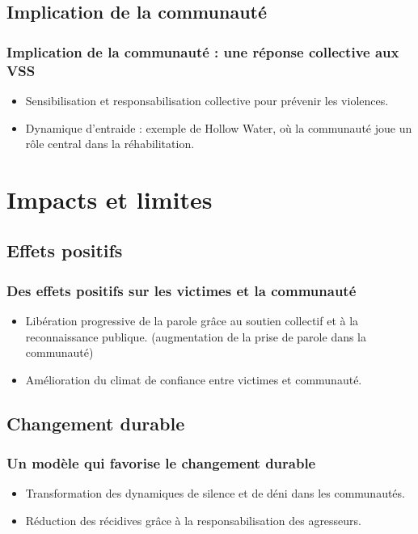 \documentclass[french]{beamer}
\begin{document}
\subsection{Implication de la communauté}
\begin{frame}
  \frametitle{Implication de la communauté : une réponse collective aux VSS}
  \begin{itemize}
    \item Sensibilisation et responsabilisation collective pour prévenir les violences.
    \item Dynamique d’entraide : exemple de Hollow Water, où la communauté joue un rôle central dans la réhabilitation.
  \end{itemize}
\end{frame}

\section{Impacts et limites}
\subsection{Effets positifs}
\begin{frame}
  \frametitle{Des effets positifs sur les victimes et la communauté}
  \begin{itemize}
    \item Libération progressive de la parole grâce au soutien collectif et à la reconnaissance publique. (augmentation de la prise de parole dans la communauté)
    \item Amélioration du climat de confiance entre victimes et communauté.
  \end{itemize}
\end{frame}

\subsection{Changement durable}
\begin{frame}
  \frametitle{Un modèle qui favorise le changement durable}
  \begin{itemize}
    \item Transformation des dynamiques de silence et de déni dans les communautés.
    \item Réduction des récidives grâce à la responsabilisation des agresseurs.
  \end{itemize}
\end{frame}
\end{document}
